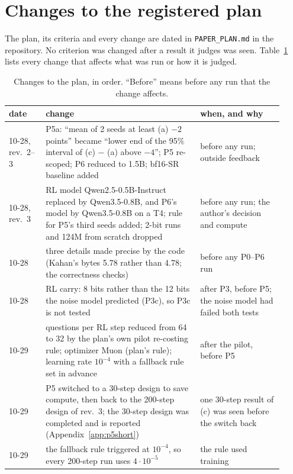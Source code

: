 \documentclass[11pt]{article}
\begin{document}
\section{Changes to the registered plan}\label{app:changes}
The plan, its criteria and every change are dated in \texttt{PAPER\_PLAN.md} in the repository. No criterion was
changed after a result it judges was seen. Table~\ref{tab:changes} lists every change that affects what was run or how
it is judged.

\begin{table}[!htbp]
\centering
\caption{Changes to the plan, in order. ``Before'' means before any run that the change affects.}
\label{tab:changes}
\small
\begin{tabular}{p{0.11\linewidth}p{0.52\linewidth}p{0.29\linewidth}}
\toprule
date & change & when, and why \\
\midrule
10-28, rev.~2--3 & P5a: ``mean of 2 seeds at least (a) $-2$ points'' became ``lower end of the 95\% interval of
(c) $-$ (a) above $-4$''; P5 re-scoped; P6 reduced to 1.5B; bf16-SR baseline added & before any run; outside
feedback \\
10-28, rev.~3 & RL model Qwen2.5-0.5B-Instruct replaced by Qwen3.5-0.8B, and P6's model by Qwen3.5-0.8B on a T4;
rule for P5's third seeds added; 2-bit runs and 124M from scratch dropped & before any run; the author's decision and
compute \\
10-28 & three details made precise by the code (Kahan's bytes 5.78 rather than 4.78; the correctness checks) & before
any P0--P6 run \\
10-28 & RL carry: 8 bits rather than the 12 bits the noise model predicted (P3c), so P3c is not tested & after P3,
before P5; the noise model had failed both tests \\
10-29 & questions per RL step reduced from 64 to 32 by the plan's own pilot re-costing rule; optimizer Muon (plan's
rule); learning rate $10^{-4}$ with a fallback rule set in advance & after the pilot, before P5 \\
10-29 & P5 switched to a 30-step design to save compute, then back to the 200-step design of rev.~3; the 30-step design
was completed and is reported (Appendix~\ref{app:p5short}) & one 30-step result of (c) was seen before the switch
back \\
10-29 & the fallback rule triggered at $10^{-4}$, so every 200-step run uses $4\cdot10^{-5}$ & the rule used training

\end{tabular}
\end{table}
\end{document}
